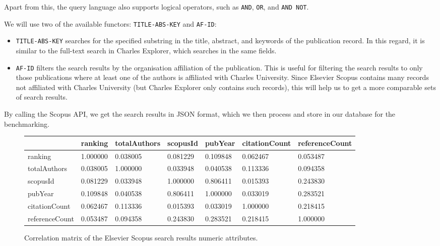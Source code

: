 Apart from this, the query language also supports logical operators, such as \texttt{AND}, \texttt{OR}, and \texttt{AND NOT}.

We will use two of the available functors: \texttt{TITLE-ABS-KEY} and \texttt{AF-ID}:

\begin{itemize}
    \item \texttt{TITLE-ABS-KEY} searches for the specified substring in the title, abstract, and keywords of the publication record. 
    In this regard, it is similar to the full-text search in Charles Explorer, which searches in the same fields.
    \item \texttt{AF-ID} filters the search results by the organisation affiliation of the publication. This is useful for filtering the search results to only those publications where at least one of the authors is affiliated with Charles University. Since Elsevier Scopus contains many records not affiliated with Charles University (but Charles Explorer only contains such records), this will help us to get a more comparable sets of search results.
\end{itemize}

By calling the Scopus API, we get the search results in JSON format, which we then process and store in our database for the benchmarking.

\begin{figure}[ht!]
        \scriptsize
        \centering
        \begin{tabular}{|l|l|l|l|l|l|l|}
        \hline
            ~ & ranking & totalAuthors & scopusId & pubYear & citationCount & referenceCount \\ \hline
            ranking & 1.000000 & 0.038005 & 0.081229 & 0.109848 & 0.062467 & 0.053487 \\ \hline
            totalAuthors & 0.038005 & 1.000000 & 0.033948 & 0.040538 & 0.113336 & 0.094358 \\ \hline
            scopusId & 0.081229 & 0.033948 & 1.000000 & 0.806411 & 0.015393 & 0.243830 \\ \hline
            pubYear & 0.109848 & 0.040538 & 0.806411 & 1.000000 & 0.033019 & 0.283521 \\ \hline
            citationCount & 0.062467 & 0.113336 & 0.015393 & 0.033019 & 1.000000 & 0.218415 \\ \hline
            referenceCount & 0.053487 & 0.094358 & 0.243830 & 0.283521 & 0.218415 & 1.000000 \\ \hline
        \end{tabular}
    \caption{Correlation matrix of the Elsevier Scopus search results numeric attributes.} 
\end{figure}

